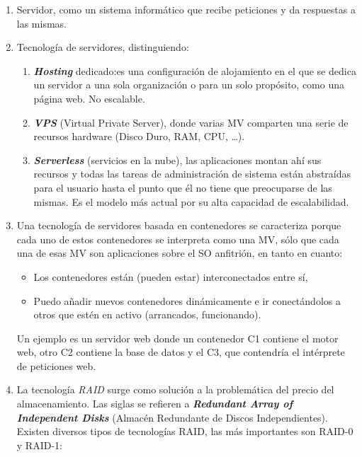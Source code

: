 \documentclass[
]{memoir}
\providecommand{\tightlist}{%
  \setlength{\itemsep}{0pt}\setlength{\parskip}{0pt}}
\begin{document}
\begin{enumerate}
\def\labelenumi{\arabic{enumi}.}
\item
  Servidor, como un sistema informático que recibe peticiones y da respuestas a las mismas.
\item
  Tecnología de servidores, distinguiendo:

  \begin{enumerate}
  \def\labelenumii{\alph{enumii}.}
  \tightlist
  \item
    \textbf{\emph{Hosting}} dedicado:es una configuración de alojamiento en el que se dedica un servidor a una sola organización o para un solo propósito, como una página web. No escalable.
  \item
    \textbf{\emph{VPS}} (Virtual Private Server), donde varias MV comparten una serie de recursos hardware (Disco Duro, RAM, CPU, \ldots).
  \item
    \textbf{\emph{Serverless}} (servicios en la nube), las aplicaciones montan ahí sus recursos y todas las tareas de administración de sistema están abstraídas para el usuario hasta el punto que él no tiene que preocuparse de las mismas. Es el modelo más actual por su alta capacidad de escalabilidad.
  \end{enumerate}
\item
  Una tecnología de servidores basada en contenedores se caracteriza porque cada uno de estos contenedores se interpreta como una MV, sólo que cada una de esas MV son aplicaciones sobre el SO anfitrión, en tanto en cuanto:

  \begin{itemize}
  \tightlist
  \item
    Los contenedores están (pueden estar) interconectados entre sí,
  \item
    Puedo añadir nuevos contenedores dinámicamente e ir conectándolos a otros que estén en activo (arrancados, funcionando).
  \end{itemize}

  Un ejemplo es un servidor web donde un contenedor C1 contiene el motor web, otro C2 contiene la base de datos y el C3, que contendría el intérprete de peticiones web.
\item
  La tecnología \emph{RAID} surge como solución a la problemática del precio del almacenamiento. Las siglas se refieren a \textbf{\emph{Redundant Array of Independent Disks}} (Almacén Redundante de Discos Independientes). Existen diversos tipos de tecnologías RAID, las más importantes son RAID-0 y RAID-1:


\end{enumerate}
\end{document}
